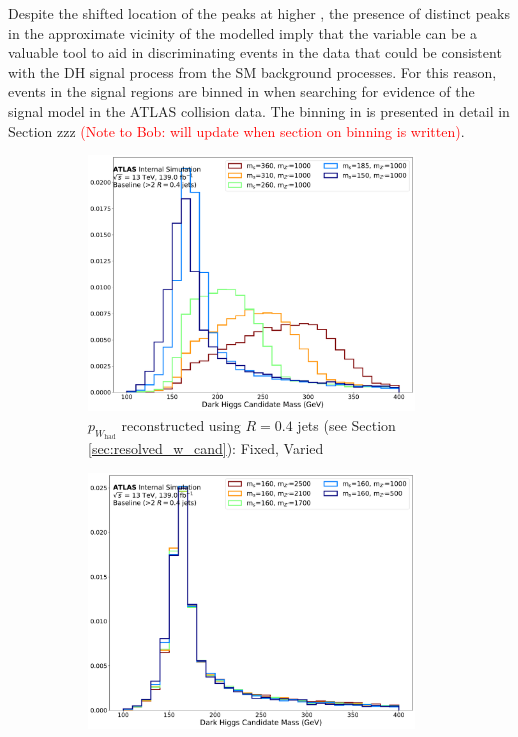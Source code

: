 Despite the shifted location of the peaks at higher \ms, the presence of distinct peaks in the approximate vicinity of the modelled \ms imply that the \minms variable can be a valuable tool to aid in discriminating events in the data that could be consistent with the DH signal process from the SM background processes. For this reason, events in the signal regions are binned in \ms when searching for evidence of the signal model in the ATLAS collision data. The binning in \minms is presented in detail in Section zzz \textcolor{red}{(Note to Bob: will update when section on binning is written)}.

\begin{figure}[H]
	\centering
	\begin{subfigure}[b]{0.49\textwidth}
	\includegraphics[width=0.95\textwidth]{Figures/5/TARJets10_minmS_res_ms.pdf}
	\caption{\(p_{W_\text{had}}\) reconstructed using \(R=0.4\) \smallR jets (see Section \ref{sec:resolved_w_cand}): \mZp Fixed, \ms Varied}
	\label{fig:minms_res_ms}
	\end{subfigure}
	\begin{subfigure}[b]{0.49\textwidth}
	\includegraphics[width=0.95\textwidth]{Figures/5/TARJets10_minmS_res_mZp.pdf}

\end{subfigure}
\end{figure}
